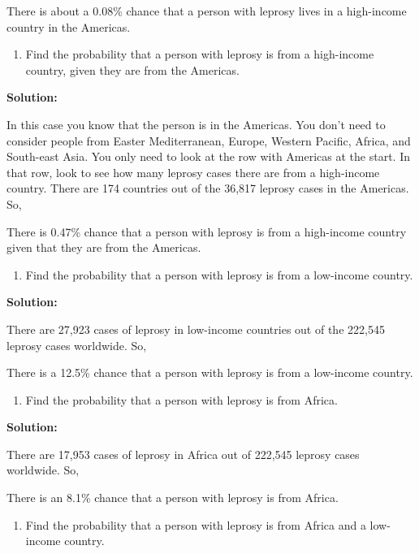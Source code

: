 \documentclass[]{book}
\providecommand{\tightlist}{%
  \setlength{\itemsep}{0pt}\setlength{\parskip}{0pt}}
\begin{document}
There is about a 0.08\% chance that a person with leprosy lives in a
high-income country in the Americas.

\begin{enumerate}
\def\labelenumi{\alph{enumi}.}
\setcounter{enumi}{3}
\tightlist
\item
  Find the probability that a person with leprosy is from a
  high-income country, given they are from the Americas.
\end{enumerate}

\textbf{Solution:}

In this case you know that the person is in the Americas. You don't
need to consider people from Easter Mediterranean, Europe, Western
Pacific, Africa, and South-east Asia. You only need to look at the
row with Americas at the start. In that row, look to see how many
leprosy cases there are from a high-income country. There are 174
countries out of the 36,817 leprosy cases in the Americas. So,

There is 0.47\% chance that a person with leprosy is from a
high-income country given that they are from the Americas.

\begin{enumerate}
\def\labelenumi{\alph{enumi}.}
\setcounter{enumi}{4}
\tightlist
\item
  Find the probability that a person with leprosy is from a low-income
  country.
\end{enumerate}

\textbf{Solution:}

There are 27,923 cases of leprosy in low-income countries out of the
222,545 leprosy cases worldwide. So,

There is a 12.5\% chance that a person with leprosy is from a
low-income country.

\begin{enumerate}
\def\labelenumi{\alph{enumi}.}
\setcounter{enumi}{5}
\tightlist
\item
  Find the probability that a person with leprosy is from Africa.
\end{enumerate}

\textbf{Solution:}

There are 17,953 cases of leprosy in Africa out of 222,545 leprosy
cases worldwide. So,

There is an 8.1\% chance that a person with leprosy is from Africa.

\begin{enumerate}
\def\labelenumi{\alph{enumi}.}
\setcounter{enumi}{6}
\tightlist
\item
  Find the probability that a person with leprosy is from Africa and a
  low-income country.
\end{enumerate}
\end{document}
